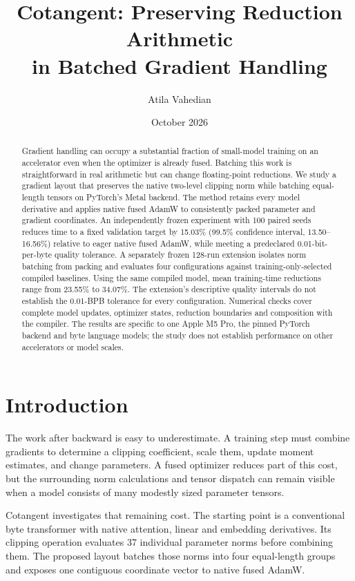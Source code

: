 \documentclass[11pt]{article}
\title{Cotangent: Preserving Reduction Arithmetic\\in Batched Gradient Handling}
\author{Atila Vahedian}
\date{October 2026}
\begin{document}
\maketitle
\begin{abstract}
Gradient handling can occupy a substantial fraction of small-model training on
an accelerator even when the optimizer is already fused. Batching this work is
straightforward in real arithmetic but can change floating-point reductions.
We study a gradient layout that preserves the native two-level clipping norm
while batching equal-length tensors on PyTorch's Metal backend. The method
retains every model derivative and applies native fused AdamW to consistently
packed parameter and gradient coordinates. An independently frozen experiment
with 100 paired seeds reduces time to a fixed validation target by 15.03\%
(99.5\% confidence interval, 13.50--16.56\%) relative to eager native fused
AdamW, while meeting a predeclared 0.01-bit-per-byte quality tolerance.
A separately frozen 128-run extension isolates norm batching from packing and evaluates four configurations against training-only-selected compiled baselines. Using the same compiled model, mean training-time reductions range from 23.55\% to 34.07\%. 
The extension's descriptive quality intervals do not establish the 0.01-BPB tolerance for every configuration.
Numerical checks cover complete model updates, optimizer states, reduction
boundaries and composition with the compiler. The results are specific to one
Apple M5 Pro, the pinned PyTorch backend and byte language models; the study
does not establish performance on other accelerators or model scales.
\end{abstract}

\section{Introduction}
The work after backward is easy to underestimate. A training step must combine
gradients to determine a clipping coefficient, scale them, update moment
estimates, and change parameters. A fused optimizer reduces part of this cost,
but the surrounding norm calculations and tensor dispatch can remain visible
when a model consists of many modestly sized parameter tensors.

Cotangent investigates that remaining cost. The starting point is a conventional
byte transformer with native attention, linear and embedding derivatives. Its
clipping operation evaluates 37 individual parameter norms before combining
them. The proposed layout batches those norms into four equal-length groups
and exposes one contiguous coordinate vector to native fused AdamW.
\end{document}
